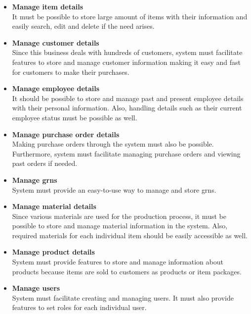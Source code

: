 \documentclass[12pt]{report}
\begin{document}
\begin{itemize}
	\item {\bf{Manage item details}} \\
	      It must be possible to store large amount of items with their information and easily search, edit and delete if the need arises.

	\item {\bf{Manage customer details}} \\
	      Since this business deals with hundreds of customers, system must facilitate features to store and manage customer information making it easy and fast for customers to make their purchases.

	\item {\bf{Manage employee details}} \\
	      It should be possible to store and manage past and present employee details with their personal information. Also, handling details such as their current employee status must be possible as well.

	\item {\bf{Manage purchase order details}} \\
	      Making purchase orders through the system must also be possible. Furthermore, system must facilitate managing purchase orders and viewing past orders if needed.

	\item {\bf{Manage \acrshort{grn}s}} \\
	      System must provide an easy-to-use way to manage and store \acrlong{grn}s.

	\item {\bf{Manage material details}} \\
	      Since various materials are used for the production process, it must be possible to store and manage material information in the system. Also, required materials for each individual item should be easily accessible as well.

	\item {\bf{Manage product details}} \\
	      System must provide features to store and manage information about products because items are sold to customers as products or item packages.

	\item {\bf{Manage users}} \\
	      System must facilitate creating and managing users. It must also provide features to set roles for each individual user.


\end{itemize}
\end{document}
